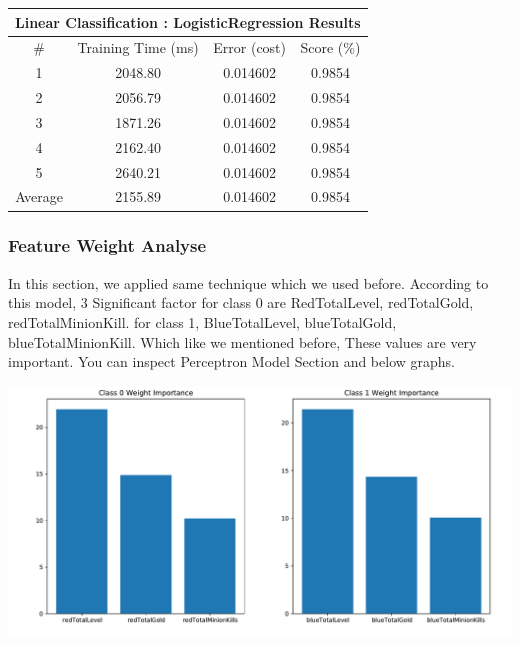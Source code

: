 \documentclass[a4paper]{article}
\begin{document}
\begin{table}[H]
\centering
\begin{tabular}{|cccc|}
\hline
\multicolumn{4}{|c|}{\textbf{Linear Classification : LogisticRegression Results}} \\ \hline
\#             & Training Time (ms)       & Error (cost)       & Score (\%)       \\ \hline
1              & 2048.80                  & 0.014602           & 0.9854           \\
2              & 2056.79                  & 0.014602           & 0.9854           \\
3              & 1871.26                  & 0.014602           & 0.9854           \\
4              & 2162.40                  & 0.014602           & 0.9854           \\
5              & 2640.21                  & 0.014602           & 0.9854           \\ \hline
Average        & 2155.89                  & 0.014602           & 0.9854           \\ \hline
\end{tabular}
\end{table}

\subsubsection{Feature Weight Analyse}

In this section, we applied same technique which we used before. According to this model, 3 Significant factor for class 0 are RedTotalLevel, redTotalGold, redTotalMinionKill. for class 1, BlueTotalLevel, blueTotalGold, blueTotalMinionKill. Which like we mentioned before, These values are very important. You can inspect Perceptron Model Section and below graphs.

\medskip

\includegraphics[width=.9\linewidth]{graphs/logisticregression_feature_importance_weights.pdf}
\end{document}
